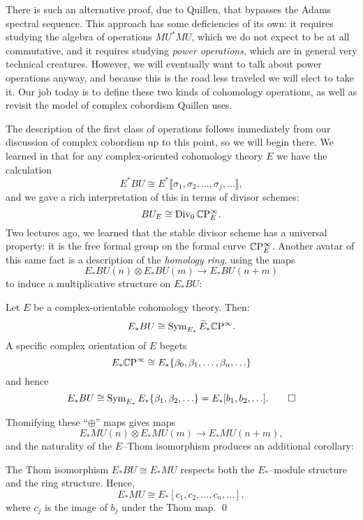There is such an alternative proof, due to Quillen, that bypasses the Adams spectral sequence.  This approach has some deficiencies of its own: it requires studying the algebra of operations $MU^* MU$, which we do not expect to be at all commutative, and it requires studying \textit{power operations}, which are in general very technical creatures.  However, we will eventually want to talk about power operations anyway, and because this is the road less traveled we will elect to take it.  Our job today is to define these two kinds of cohomology operations, as well as revisit the model of complex cobordism Quillen uses.

The description of the first class of operations follows immediately from our discussion of complex cobordism up to this point, so we will begin there.  We learned in  that for any complex-oriented cohomology theory $E$ we have the calculation \[E^* BU \cong E^*\llbracket \sigma_1, \sigma_2, \ldots, \sigma_j, \ldots\rrbracket,\] and we gave a rich interpretation of this in terms of divisor schemes: \[BU_E \cong \operatorname{Div}_0 \mathbb{C}\mathrm P^\infty_E.\]  Two lectures ago, we learned that the stable divisor scheme has a universal property: it is the free formal group on the formal curve $\mathbb{C}\mathrm P^\infty_E$.  Another avatar of this same fact is a description of the \emph{homology ring}, using the maps \[E_* BU(n) \otimes E_* BU(m) \to E_* BU(n+m)\] to induce a multiplicative structure on $E_* BU$:
\begin{corollary}
Let $E$ be a complex-orientable cohomology theory. Then: \[E_* BU \cong \operatorname{Sym}_{E_*} \widetilde E_* \mathbb{C}\mathrm P^\infty.\]  A specific complex orientation of $E$ begets \[E_* \mathbb{C}\mathrm P^\infty \cong E_*\{\beta_0, \beta_1, \ldots, \beta_n, \ldots\}\] and hence \[E_* BU \cong \operatorname{Sym}_{E_*} E_*\{\beta_1, \beta_2, \ldots\} = E_*[b_1, b_2, \ldots]. \qed\]
\end{corollary} 

Thomifying these ``$\oplus$'' maps gives maps \[E_* MU(n) \otimes E_* MU(m) \to E_* MU(n+m),\] and the naturality of the $E$--Thom isomorphism produces an additional corollary:
\begin{corollary}
The Thom isomorphism $E_* BU \cong E_* MU$ respects both the $E_*$--module structure and the ring structure.  Hence, \[E_* MU \cong E_*[c_1, c_2, \ldots, c_n, \ldots],\] where $c_j$ is the image of $b_j$ under the Thom map. \qed
\end{corollary}

